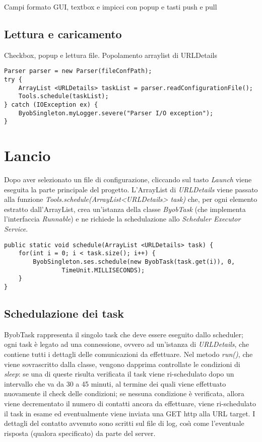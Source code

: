 Campi formato GUI, textbox e impicci con popup e tasti push e pull

\subsection{Lettura e caricamento}
Checkbox, popup e lettura file.
Popolamento arraylist di URLDetails

\vspace{0.5cm}
\begin{lstlisting}
Parser parser = new Parser(fileConfPath);
try {
	ArrayList <URLDetails> taskList = parser.readConfigurationFile();
	Tools.schedule(taskList);
} catch (IOException ex) {
	ByobSingleton.myLogger.severe("Parser I/O exception");
}
\end{lstlisting}


\section{Lancio}
Dopo aver selezionato un file di configurazione, cliccando sul tasto \textit{Launch} viene eseguita la parte principale del progetto.
L'ArrayList di \textit{URLDetails} viene passato alla funzione \textit{Tools.schedule(ArrayList<URLDetails> task)} che, per ogni elemento estratto dall'ArrayList, crea un'istanza della classe \textit{ByobTask} (che implementa l'interfaccia \textit{Runnable}) e ne richiede la schedulazione allo \textit{Scheduler Executor Service}.

\vspace{0.5cm}
\begin{lstlisting}
public static void schedule(ArrayList <URLDetails> task) {
    for(int i = 0; i < task.size(); i++) {
	    ByobSingleton.ses.schedule(new ByobTask(task.get(i)), 0,
			    TimeUnit.MILLISECONDS);
    }
}
\end{lstlisting}


\subsection{Schedulazione dei task}
ByobTask rappresenta il singolo task che deve essere eseguito dallo scheduler; ogni task \`{e} legato ad una connessione, ovvero ad un'istanza di \textit{URLDetails}, che contiene tutti i dettagli delle comunicazioni da effettuare.
Nel metodo \textit{run()}, che viene sovrascritto dalla classe, vengono dapprima controllate le condizioni di \textit{sleep}: 
se una di queste risulta verificata il task viene ri-schedulato dopo un intervallo che va da 30 a 45 minuti, al termine dei quali viene effettuato nuovamente il check delle condizioni;
se nessuna condizione \`{e} verificata, allora viene decrementato il numero di contatti ancora da effettuare, viene ri-schedulato il task in esame ed eventualmente viene inviata una GET http alla URL target.
I dettagli del contatto avvenuto sono scritti sul file di log, cos\`{\i} come l'eventuale risposta (qualora specificato) da parte del server.

